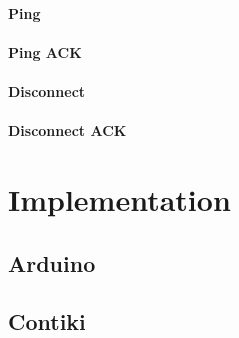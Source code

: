 \documentclass{l4proj}
\begin{document}

\subsubsection{Ping} %
\label{ssub:ping}


\subsubsection{Ping ACK} %
\label{ssub:ping_ack}


\subsubsection{Disconnect} %
\label{ssub:disconnect}


\subsubsection{Disconnect ACK} %
\label{ssub:disconnect_ack}











\chapter{Implementation} %
\label{cha:implementation}

\section{Arduino} %
\label{sec:arduino}



\section{Contiki} %
\label{sec:contiki}
\end{document}
